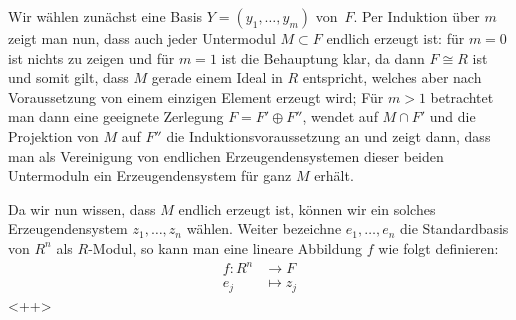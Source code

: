 \begin{proofsketch}
    Wir wählen zunächst eine Basis $Y = (y_1,\ldots,y_m)$ von~$F$. Per Induktion
    über $m$ zeigt man nun, dass auch jeder Untermodul $M\subset F$ endlich
    erzeugt ist: für $m=0$ ist nichts zu zeigen und für $m=1$ ist die Behauptung
    klar, da dann $F\cong R$ ist und somit gilt, dass $M$ gerade einem Ideal in
    $R$ entspricht, welches aber nach Voraussetzung von einem einzigen Element erzeugt
    wird; Für $m>1$ betrachtet man dann eine geeignete Zerlegung $F = F'
    \oplus F''$, wendet auf $M\cap F'$ und die Projektion von $M$ auf $F''$ die
    Induktionsvoraussetzung an und zeigt dann, dass man als Vereinigung von
    endlichen Erzeugendensystemen dieser beiden Untermoduln ein
    Erzeugendensystem für ganz $M$ erhält.
    
    Da wir nun wissen, dass $M$ endlich erzeugt ist, können wir ein solches
    Erzeugendensystem $z_1,\ldots,z_n$ wählen. Weiter bezeichne $e_1,\ldots,e_n$
    die Standardbasis von $R^n$ als $R$-Modul, so kann man eine lineare
    Abbildung $f$ wie folgt definieren:
    \begin{align*}
        f\colon R^n &\to F  \\
        e_j &\mapsto z_j
    \end{align*}
    <++>
    \\
\end{proofsketch}












